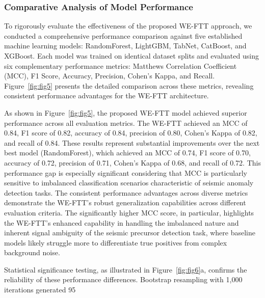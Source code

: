 \documentclass[preprint,review,12pt,authoryear]{elsarticle}
\begin{document}
\subsubsection{Comparative Analysis of Model Performance}
To rigorously evaluate the effectiveness of the proposed WE-FTT approach, we conducted a comprehensive performance comparison against five established machine learning models: RandomForest, LightGBM, TabNet, CatBoost, and XGBoost. Each model was trained on identical dataset splits and evaluated using six complementary performance metrics: Matthews Correlation Coefficient (MCC), F1 Score, Accuracy, Precision, Cohen's Kappa, and Recall. Figure~\ref{fig:fig5} presents the detailed comparison across these metrics, revealing consistent performance advantages for the WE-FTT architecture.

As shown in Figure~\ref{fig:fig5}, the proposed WE-FTT model achieved superior performance across all evaluation metrics. The WE-FTT achieved an MCC of 0.84, F1 score of 0.82, accuracy of 0.84, precision of 0.80, Cohen's Kappa of 0.82, and recall of 0.84. These results represent substantial improvements over the next best model (RandomForest), which achieved an MCC of 0.74, F1 score of 0.70, accuracy of 0.72, precision of 0.71, Cohen's Kappa of 0.68, and recall of 0.72. This performance gap is especially significant considering that MCC is particularly sensitive to imbalanced classification scenarios characteristic of seismic anomaly detection tasks. The consistent performance advantages across diverse metrics demonstrate the WE-FTT's robust generalization capabilities across different evaluation criteria. The significantly higher MCC score, in particular, highlights the WE-FTT's enhanced capability in handling the imbalanced nature and inherent signal ambiguity of the seismic precursor detection task, where baseline models likely struggle more to differentiate true positives from complex background noise.

Statistical significance testing, as illustrated in Figure~\ref{fig:fig6}a, confirms the reliability of these performance differences. Bootstrap resampling with 1,000 iterations generated 95%
\end{document}
